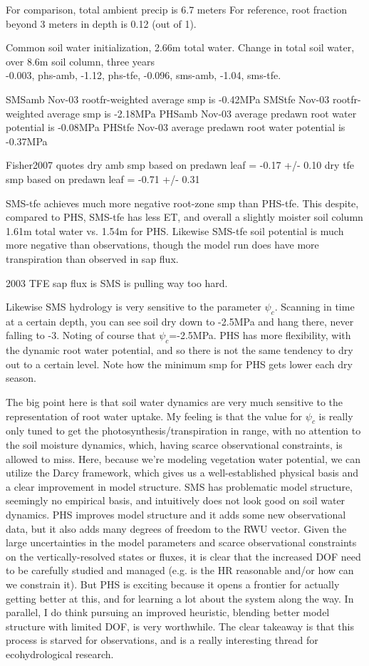 \documentclass[draft,linenumbers]{agujournal}
\begin{document}
For comparison, total ambient precip is 6.7 meters
For reference, root fraction beyond 3 meters in depth is 0.12 (out of 1).

Common soil water initialization, 2.66m total water. Change in total soil water, over 8.6m soil column, three years \\
   -0.003, phs-amb,
   -1.12, phs-tfe,
   -0.096, sms-amb,
   -1.04, sms-tfe.

SMSamb Nov-03 rootfr-weighted average smp is -0.42MPa
SMStfe Nov-03 rootfr-weighted average smp is -2.18MPa
PHSamb Nov-03 average predawn root water potential is -0.08MPa
PHStfe Nov-03 average predawn root water potential is -0.37MPa

Fisher2007 quotes dry amb smp based on predawn leaf = -0.17 +/- 0.10
dry tfe smp based on predawn leaf = -0.71 +/- 0.31

SMS-tfe achieves much more negative root-zone smp than PHS-tfe.
This despite, compared to PHS, SMS-tfe has less ET, and overall a slightly moister soil column 1.61m total water vs. 1.54m for PHS.
Likewise SMS-tfe soil potential is much more negative than observations, though the model run does have more transpiration than observed in sap flux.

2003 TFE sap flux is 
SMS is pulling way too hard.

Likewise SMS hydrology is very sensitive to the parameter $\psi_c$. 
Scanning in time at a certain depth, you can see soil dry down to -2.5MPa and hang there, never falling to -3.
Noting of course that $\psi_c$=-2.5MPa.
PHS has more flexibility, with the dynamic root water potential, and so there is not the same tendency to dry out to a certain level.
Note how the minimum smp for PHS gets lower each dry season.

The big point here is that soil water dynamics are very much sensitive to the representation of root water uptake.
My feeling is that the value for $\psi_c$ is really only tuned to get the photosynthesis/transpiration in range, 
with no attention to the soil moisture dynamics, which, having scarce observational constraints, is allowed to miss.
Here, because we're modeling vegetation water potential, we can utilize the Darcy framework, which gives us a well-established physical basis and a clear improvement in model structure.
SMS has problematic model structure, seemingly no empirical basis, and intuitively does not look good on soil water dynamics.
PHS improves model structure and it adds some new observational data, but it also adds many degrees of freedom to the RWU vector. 
Given the large uncertainties in the model parameters and scarce observational constraints on the vertically-resolved states or fluxes, 
it is clear that the increased DOF need to be carefully studied and managed (e.g. is the HR reasonable and/or how can we constrain it).
But PHS is exciting because it opens a frontier for actually getting better at this, and for learning a lot about the system along the way.
In parallel, I do think pursuing an improved heuristic, blending better model structure with limited DOF, is very worthwhile.
The clear takeaway is that this process is starved for observations, and is a really interesting thread for ecohydrological research.
\end{document}
